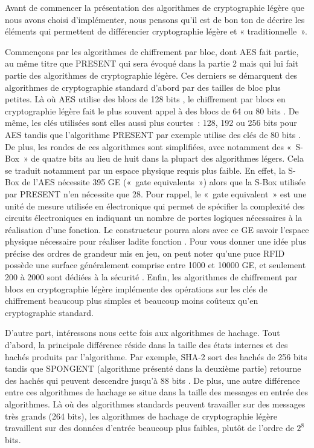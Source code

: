 Avant de commencer la présentation des algorithmes de cryptographie légère que
nous avons choisi d'implémenter, nous pensons qu'il est de bon ton de décrire
les éléments qui permettent de différencier cryptographie légère et «
traditionnelle ».

Commençons par les algorithmes de chiffrement par bloc, dont AES fait partie,
au même titre que PRESENT qui sera évoqué dans la partie 2 mais qui lui fait
partie des algorithmes de cryptographie légère. Ces derniers se démarquent des
algorithmes de cryptographie standard d'abord par des tailles de bloc plus
petites. Là où AES utilise des blocs de 128 bits \cite{AES-FIPS}, le
chiffrement par blocs en cryptographie légère fait le plus souvent appel à des
blocs de 64 ou 80 bits \cite{Report_light}. De même, les clés utilisées sont
elles aussi plus courtes : 128, 192 ou 256 bits pour AES \cite{AES-FIPS}
tandis que l'algorithme PRESENT par exemple utilise des clés de 80 bits
\cite{PRESENT}. De plus, les rondes de ces algorithmes sont simplifiées, avec
notamment des « S-Box » de quatre bits au lieu de huit dans la plupart des
algorithmes légers. Cela se traduit notamment par un espace physique requis
plus faible. En effet, la S-Box de l'AES nécessite 395 GE \cite{RFID} (« gate
equivalents ») alors que la S-Box utilisée par PRESENT n'en nécessite que 28.
Pour rappel, le « gate equivalent » est une unité de mesure utilisée en
électronique qui permet de spécifier la complexité des circuits électroniques
en indiquant un nombre de portes logiques nécessaires à la réalisation d'une
fonction. Le constructeur pourra alors avec ce GE savoir l'espace physique
nécessaire pour réaliser ladite fonction \cite{wiki_gate}. Pour vous donner
une idée plus précise des ordres de grandeur mis en jeu, on peut noter qu'une
puce RFID possède une surface généralement comprise entre 1000 et 10000 GE, et
seulement 200 à 2000 sont dédiées à la sécurité \cite{Report_light}. Enfin,
les algorithmes de chiffrement par blocs en cryptographie légère implémente
des opérations sur les clés de chiffrement beaucoup plus simples et beaucoup
moins coûteux qu'en cryptographie standard.

D'autre part, intéressons nous cette fois aux algorithmes de hachage. Tout
d'abord, la principale différence réside dans la taille des états internes et
des hachés produits par l'algorithme. Par exemple, SHA-2 sort des hachés de
256 bits tandis que SPONGENT (algorithme présenté dans la deuxième partie)
retourne des hachés qui peuvent descendre jusqu'à 88 bits \cite{6275435}. De
plus, une autre différence entre ces algorithmes de hachage se situe dans la
taille des messages en entrée des algorithmes. Là où des algorithmes standards
peuvent travailler sur des messages très grands (264 bits), les algorithmes de
hachage de cryptographie légère travaillent sur des données d'entrée beaucoup
plus faibles, plutôt de l'ordre de $2^8$ bits.


